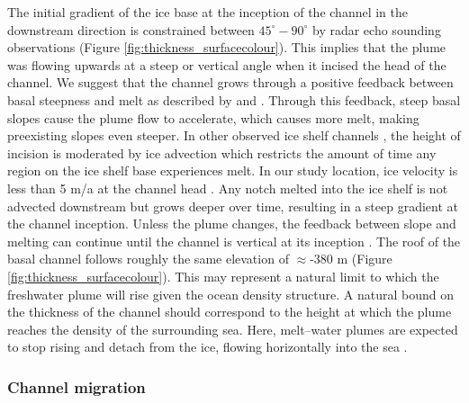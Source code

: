 The initial gradient of the ice base at the inception of the channel in the downstream direction is constrained between $45^{\circ}-90^{\circ}$ by radar echo sounding observations (Figure \ref{fig:thickness_surfacecolour}).  This implies that the plume was flowing upwards at a steep or vertical angle when it incised the head of the channel. We suggest that the channel grows through a positive feedback between basal steepness and melt as described by \cite{sergienko2013basal} and \cite{gladish2012ice}. Through this feedback, steep basal slopes cause the plume flow to accelerate, which causes more melt, making preexisting slopes even steeper. 
In other observed ice shelf channels \cite [e.g.][] {drews2017actively, jeofry2018hard}, the height of incision is moderated by ice advection which restricts the amount of time any region on the ice shelf base experiences melt. 
In our study location, ice velocity is less than 5 m/a at the channel head \citep{rignot2017measures}. Any notch melted into the ice shelf is not advected downstream but grows deeper over time, resulting in a steep gradient at the channel inception. Unless the plume changes, the feedback between slope and melting can continue until the channel is vertical at its inception \citep{sergienko2013basal,gladish2012ice}. The roof of the basal channel follows roughly the same elevation of $\approx$-380 m (Figure \ref{fig:thickness_surfacecolour}). This may represent a natural limit to which the freshwater plume will rise given the ocean density structure. A natural bound on the thickness of the channel should correspond to the height at which the plume reaches the density of the surrounding sea. Here, melt--water plumes are expected to stop rising and detach from the ice, flowing horizontally into the sea \citep{jenkins2011convection, hewitt2020subglacial}.


\subsubsection{Channel migration} \label{sec:side_melt}

